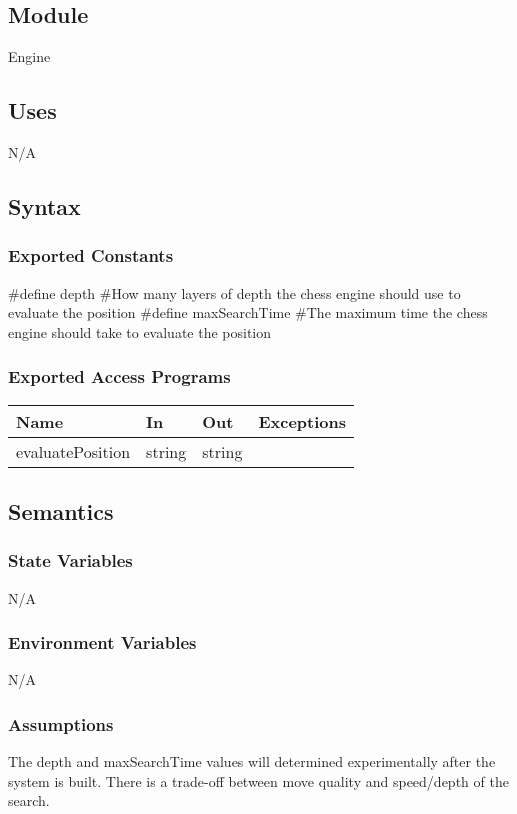 \documentclass[12pt, titlepage]{article}
\begin{document}
    \subsection{Module}
    Engine

    \subsection{Uses}
    N/A

    \subsection{Syntax}
    \subsubsection{Exported Constants}
    \#define depth \#How many layers of depth the chess engine should use to evaluate the position
    \#define maxSearchTime \#The maximum time the chess engine should take to evaluate the position
    
    \subsubsection{Exported Access Programs}
        \begin{center}
        \begin{tabular}{p{4cm} p{3cm} p{3cm} p{2.5cm}}
        \hline
        \textbf{Name} & \textbf{In} & \textbf{Out} & \textbf{Exceptions} \\
        \hline
        evaluatePosition & string & string & \\
        \hline
        \end{tabular}
        \end{center}

    \subsection{Semantics}
    \subsubsection{State Variables}
    N/A

    \subsubsection{Environment Variables}
    N/A

    \subsubsection{Assumptions}
    The depth and maxSearchTime values will determined experimentally after the system is built. 
    There is a trade-off between move quality and speed/depth of the search.
\end{document}
